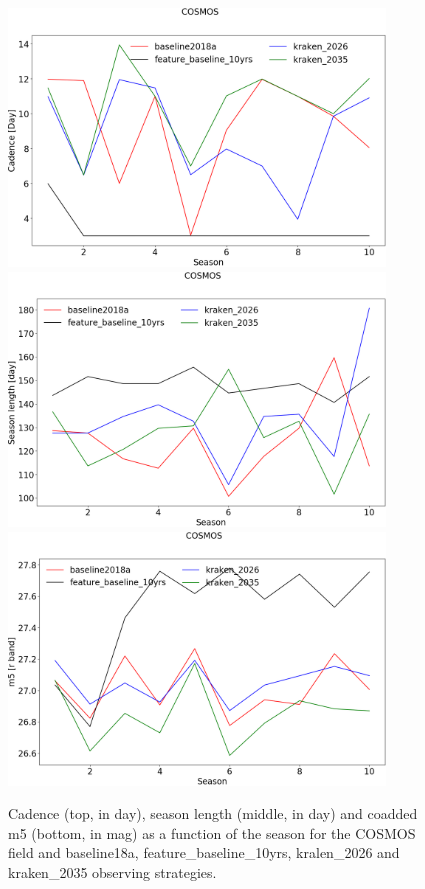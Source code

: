 \begin{figure}[htbp]
\begin{center}
  \includegraphics[width=10cm]{Figures/COSMOS_cadence.png}
  \includegraphics[width=10cm]{Figures/COSMOS_season_length.png}
  \includegraphics[width=10cm]{Figures/COSMOS_m5.png}
 \caption{Cadence (top, in day), season length (middle, in day) and coadded m5 (bottom, in mag) as a function of the season for the COSMOS field and baseline18a, feature\_baseline\_10yrs, kralen\_2026 and kraken\_2035 observing strategies.}\label{fig:cosmos_cad}
\end{center}
\end{figure}

